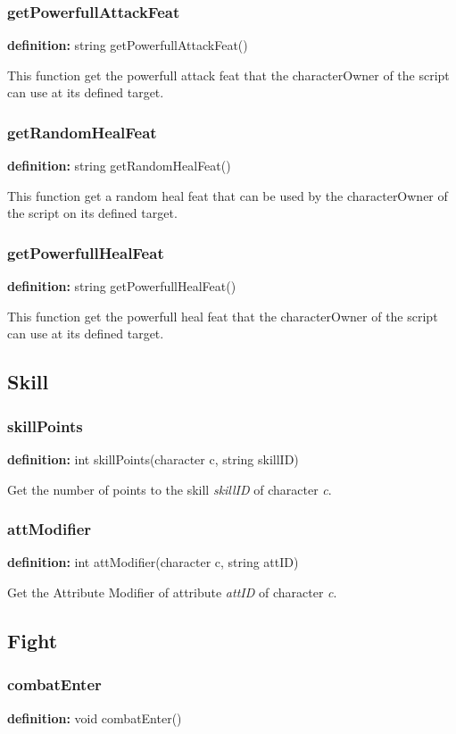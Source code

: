 \documentclass[ letterpaper,12pt]{article}
\begin{document}
\subsubsection{getPowerfullAttackFeat}
{\bf definition:} string getPowerfullAttackFeat()

This function get the powerfull attack feat that the characterOwner
of the script can use at its defined target.

\subsubsection{getRandomHealFeat}
{\bf definition:} string getRandomHealFeat()

This function get a random heal feat that can be used by
the characterOwner of the script on its defined target.

\subsubsection{getPowerfullHealFeat}
{\bf definition:} string getPowerfullHealFeat()

This function get the powerfull heal feat that the characterOwner
of the script can use at its defined target.

\subsection{Skill}

\subsubsection{skillPoints}
{\bf definition:} int skillPoints(character c, string skillID)

Get the number of points to the skill {\it skillID} of character {\it c}.

\subsubsection{attModifier}
{\bf definition:} int attModifier(character c, string attID)

Get the Attribute Modifier of attribute {\it attID} of character {\it c}.

\subsection{Fight}

\subsubsection{combatEnter}
{\bf definition:} void combatEnter()
\end{document}
